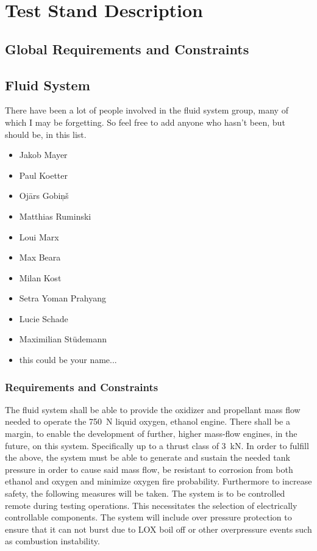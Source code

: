     \section{Test Stand Description}
    \subsection{Global Requirements and Constraints}


    \subsection{Fluid System}
        There have been a lot of people involved in the fluid system group, many of which I may be forgetting. So feel free to add anyone who hasn't been, but should be, in this list.
        \begin{itemize}
            \item Jakob Mayer
            \item Paul Koetter
            \item Ojārs Gobiņš
            \item Matthias Ruminski
            \item Loui Marx
            \item Max Beara
            \item Milan Kost
            \item Setra Yoman Prahyang
            \item Lucie Schade
            \item Maximilian Stüdemann
            
            \item this could be your name...
        \end{itemize}
        \subsubsection{Requirements and Constraints}
            The fluid system shall be able to provide the oxidizer and propellant mass flow needed to operate the \qty{750}{N} liquid oxygen, ethanol engine. There shall be a margin, to enable the development of further, higher mass-flow engines, in the future, on this system. Specifically up to a thrust class of \qty{3}{kN}. In order to fulfill the above, the system must be able to generate and sustain the needed tank pressure in order to cause said mass flow, be resistant to corrosion from both ethanol and oxygen and minimize oxygen fire probability. Furthermore to increase safety, the following measures will be taken. The system is to be controlled remote during testing operations. This necessitates the selection of electrically controllable components. The system will include over pressure protection to ensure that it can not burst due to LOX boil off or other overpressure events such as combustion instability.

